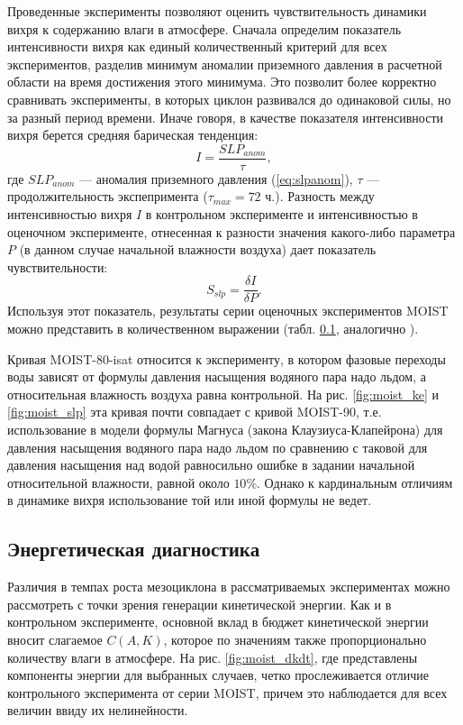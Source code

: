 \documentclass[12pt,a4paper]{report}
\begin{document}
Проведенные эксперименты позволяют оценить чувствительность динамики вихря к содержанию влаги в атмосфере. Сначала определим показатель интенсивности вихря как единый количественный критерий для всех экспериментов, разделив минимум аномалии приземного давления в расчетной области на время достижения этого минимума. Это позволит более корректно сравнивать эксперименты, в которых циклон развивался до одинаковой силы, но за разный период времени. Иначе говоря, в качестве показателя интенсивности вихря берется средняя барическая тенденция:
\begin{equation} \label{eq:intensity}
I = \frac{SLP_{anom}}{\tau},
\end{equation}
где $SLP_{anom}$ --- аномалия приземного давления (\ref{eq:slpanom}), $\tau$ --- продолжительность экспепримента ($\tau_{max}=72$ ч.). Разность между интенсивностью вихря $I$ в контрольном эксперименте и интенсивностью в оценочном эксперименте, отнесенная к разности значения какого-либо параметра $P$ (в данном случае начальной влажности воздуха) дает показатель чувствительности:
\begin{equation}
S_{slp}=\frac{\delta I}{\delta P}.
\end{equation}
Используя этот показатель, результаты серии оценочных экспериментов MOIST можно представить в количественном выражении (табл. \ref{}, аналогично \citep{LindersEtAl2011}).

\begin{table}
\end{table}

Кривая MOIST-80-isat относится к эксперименту, в котором фазовые переходы воды зависят от формулы давления насыщения водяного пара надо льдом, а относительная влажность воздуха равна контрольной. На рис. \ref{fig:moist_ke} и \ref{fig:moist_slp} эта кривая почти совпадает с кривой MOIST-90, т.е. использование в модели формулы Магнуса (закона Клаузиуса-Клапейрона) для давления насыщения водяного пара надо льдом по сравнению с таковой для давления насыщения над водой равносильно ошибке в задании начальной относительной влажности, равной около $10\%$. Однако к кардинальным отличиям в динамике вихря использование той или иной формулы не ведет.

\subsection{Энергетическая диагностика}
Различия в темпах роста мезоциклона в рассматриваемых экспериментах можно рассмотреть с точки зрения генерации кинетической энергии. Как и в контрольном эксперименте, основной вклад в бюджет кинетической энергии вносит слагаемое $C(A,K)$, которое по значениям также пропорционально количеству влаги в атмосфере. На рис. \ref{fig:moist_dkdt}, где представлены компоненты энергии для выбранных случаев, четко прослеживается отличие контрольного эксперимента от серии MOIST, причем это наблюдается для всех величин ввиду их нелинейности.
\end{document}
